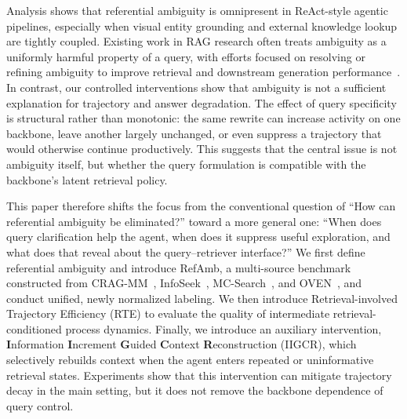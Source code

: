\documentclass{article} %
\begin{document}
Analysis shows that referential ambiguity is omnipresent in ReAct-style agentic pipelines, especially when visual entity grounding and external knowledge lookup are tightly coupled. Existing work in RAG research often treats ambiguity as a uniformly harmful property of a query, with efforts focused on resolving or refining ambiguity to improve retrieval and downstream generation performance~\citep{chan2024rq,jang2025ambiguity,liu2023we}. In contrast, our controlled interventions show that ambiguity is not a sufficient explanation for trajectory and answer degradation.
The effect of query specificity is structural rather than monotonic: the same rewrite can increase activity on one backbone, leave another largely unchanged, or even suppress a trajectory that would otherwise continue productively.
This suggests that the central issue is not ambiguity itself, but whether the query formulation is compatible with the backbone's latent retrieval policy.

This paper therefore shifts the focus from the conventional question of ``How can referential ambiguity be eliminated?'' toward a more general one: ``When does query clarification help the agent, when does it suppress useful exploration, and what does that reveal about the query--retriever interface?''
We first define referential ambiguity and introduce RefAmb, a multi-source benchmark constructed from CRAG-MM~\citep{yang2024crag}, InfoSeek~\citep{chen2023can}, MC-Search~\citep{ning2026mc}, and OVEN~\citep{hu2023open}, and conduct unified, newly normalized labeling.
We then introduce Retrieval-involved Trajectory Efficiency (RTE) to evaluate the quality of intermediate retrieval-conditioned process dynamics.
Finally, we introduce an auxiliary intervention, \textbf{I}nformation \textbf{I}ncrement \textbf{G}uided \textbf{C}ontext \textbf{R}econstruction (IIGCR), which selectively rebuilds context when the agent enters repeated or uninformative retrieval states.
Experiments show that this intervention can mitigate trajectory decay in the main setting, but it does not remove the backbone dependence of query control.
\end{document}
